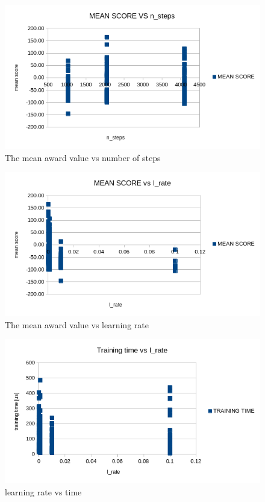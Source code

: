 \documentclass[runningheads]{llncs}
\begin{document}
\begin{figure}
  \includegraphics[width=\textwidth]{Screenshots/mean_vs_time.png}
  \caption{The mean award value vs number of steps}
  \label{fig:steps}
\end{figure}

\begin{figure}
  \includegraphics[width=\textwidth]{Screenshots/mean_vs_epochs.png}
  \caption{The mean award value vs learning rate}
  \label{fig:rate}
\end{figure}

\begin{figure}
  \includegraphics[width=\textwidth]{Screenshots/rate_vs_time.png}
  \caption{learning rate vs time}
  \label{fig:time}
\end{figure}
\end{document}
